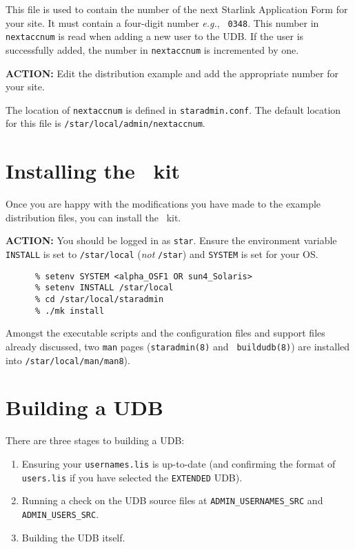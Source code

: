 This file is used to contain the number of the next Starlink Application
Form for your site. It must contain a four-digit number {\em e.g.}, {\tt
0348}. This number in {\tt nextaccnum} is read when adding a new user to
the UDB. If the user is successfully added, the number in {\tt nextaccnum}
is incremented by one.

{\large\bf ACTION:} Edit the distribution example and add the appropriate
number for your site.

The location of {\tt nextaccnum} is defined in {\tt staradmin.conf}.
The default location for this file is \newline
{\tt /star/local/admin/nextaccnum}.

\section{Installing the \staradmin\ kit}

Once you are happy with the modifications you have made to the example
distribution files, you can install the \staradmin\ kit.

{\large\bf ACTION:} You should be logged in as {\tt star}. Ensure the
environment variable {\tt INSTALL} is set to {\tt /star/local} ({\em not}
{\tt /star}) and {\tt SYSTEM} is set for your OS.

\begin{verbatim}
      % setenv SYSTEM <alpha_OSF1 OR sun4_Solaris>
      % setenv INSTALL /star/local
      % cd /star/local/staradmin
      % ./mk install
\end{verbatim}

Amongst the executable scripts and the configuration files and support
files already discussed, two {\tt man} pages ({\tt staradmin(8)} and {\tt
buildudb(8)}) are installed into {\tt /star/local/man/man8}).

\section{Building a UDB}

There are three stages to building a UDB:

\begin{enumerate}

\item Ensuring your {\tt usernames.\-lis} is up-to-date (and confirming
the format of {\tt users.lis} if you have selected the {\tt EXTENDED}
UDB).

\item Running a check on the UDB source files at {\tt ADMIN\_USERNAMES\_SRC}
and {\tt ADMIN\_USERS\_SRC}.

\item Building the UDB itself.

\end{enumerate}

